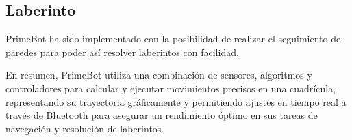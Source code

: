 \subsection{Laberinto}\label{laberinto}

PrimeBot ha sido implementado con la posibilidad de realizar el seguimiento de paredes para poder así resolver laberintos con facilidad.

En resumen, PrimeBot utiliza una combinación de sensores, algoritmos y controladores para calcular y ejecutar movimientos precisos en una cuadrícula, representando su trayectoria gráficamente y permitiendo ajustes en tiempo real a través de Bluetooth para asegurar un rendimiento óptimo en sus tareas de navegación y resolución de laberintos.

